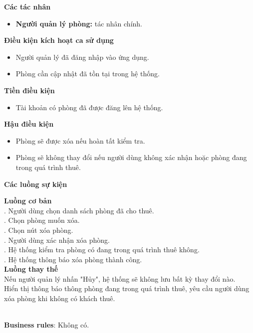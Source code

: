 \textbf{Các tác nhân}
\begin{itemize}
    \item \textbf{Người quản lý phòng:} tác nhân chính.
\end{itemize}

\textbf{Điều kiện kích hoạt ca sử dụng}
\begin{itemize}
    \item Người quản lý đã đăng nhập vào ứng dụng.
    \item Phòng cần cập nhật đã tồn tại trong hệ thống.
\end{itemize}

\textbf{Tiền điều kiện}
\begin{itemize}
    \item Tài khoản có phòng đã được đăng lên hệ thống.
\end{itemize}

\textbf{Hậu điều kiện}
\begin{itemize}
    \item Phòng sẽ được xóa nếu hoàn tất kiểm tra.
    \item Phòng sẽ không thay đổi nếu người dùng không xác nhận hoặc phòng đang trong quá trình thuê.
\end{itemize}

\textbf{Các luồng sự kiện}

\begin{small}
\textbf{Luồng cơ bản}\\
. Người dùng chọn danh sách phòng đã cho thuê.\\
. Chọn phòng muốn xóa.\\
. Chọn nút xóa phòng.\\
. Người dùng xác nhận xóa phòng.\\
. Hệ thống kiểm tra phòng có đang trong quá trình thuê không.\\
. Hệ thống thông báo xóa phòng thành công.\\

\textbf{Luồng thay thế}\\
 Nếu người quản lý nhấn "Hủy", hệ thống sẽ không lưu bất kỳ thay đổi nào.\\
 Hiển thị thông báo thông phòng đang trong quá trình thuê, yêu cầu người dùng xóa phòng khi không có khách thuê.\\
\end{small}\\
\textbf{\indent Business rules}: Không có.

